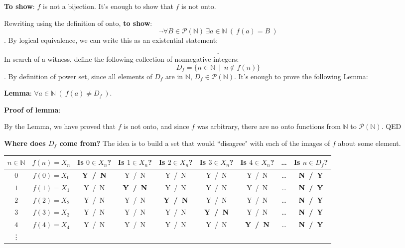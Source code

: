 \documentclass[12pt, oneside]{article}
\begin{document}
{\bf To show}: $f$ is not a bijection.  It's enough to show that $f$ is not onto.

Rewriting using the definition of  onto, {\bf to show}:
\[
\neg  \forall  B \in  \mathcal{P}(\mathbb{N}) ~\exists a \in \mathbb{N}  ~(~f(a) =  B~)
\]
. By logical  equivalence, we can write this as an existential statement:
\[
\underline{\phantom{\qquad\qquad\exists B \in  \mathcal{P}(\mathbb{N}) ~\forall a \in \mathbb{N}  ~(~f(a) \neq  B~)\qquad\qquad}}
\]
In search of a witness, define the following  collection of nonnegative integers:
\[
D_f = \{ n \in \mathbb{N}  ~\mid~  n \notin f(n)  \}
\]
. By  definition  of power  set, since  all elements  of  $D_f$ are  in  $\mathbb{N}$,   $D_f \in \mathcal{P}(\mathbb{N})$.  It's enough to prove the following Lemma: 

{\bf Lemma}: $\forall a \in \mathbb{N}  ~(~f(a) \neq  D_f~)$.


{\bf Proof  of lemma}: \\

\vspace{50pt}

By  the Lemma, we  have proved that $f$ is not onto, and since $f$ was arbitrary, there are no onto
functions from $\mathbb{N}$ to $\mathcal{P}(\mathbb{N})$. QED


{\bf Where does $D_f$ come from?} The idea is to build a set that would ``disagree" with 
each of the images of $f$ about some element. 

\begin{center}
\begin{tabular}{c|c|ccccccc}
$n \in \mathbb{N}$ & $f(n) = X_n$ &  Is $0   \in X_n$?   & Is $1 \in X_n$?  &  Is $2 \in X_n$?  &  Is $3 \in X_n$?  &
 Is $4 \in X_n$?  &  \ldots & Is $n \in D_f$?\\
\hline
$0$ & $f(0) = X_0$ & {\bf  Y~/~N}  & Y~/~N & Y~/~N & Y~/~N &Y~/~N & \ldots & {\bf  N~/~Y }\\
$1$ & $f(1) = X_1$ & Y~/~N  & {\bf  Y~/~N} & Y~/~N & Y~/~N & Y~/~N & \ldots & {\bf  N~/~Y }\\
$2$ & $f(2) = X_2$ & Y~/~N  & Y~/~N & {\bf  Y~/~N} & Y~/~N &Y~/~N & \ldots & {\bf  N~/~Y }\\
$3$ & $f(3) = X_3$ & Y~/~N  & Y~/~N & Y~/~N & {\bf  Y~/~N} & Y~/~N & \ldots & {\bf  N~/~Y }\\
$4$ & $f(4) = X_4$ & Y~/~N  & Y~/~N & Y~/~N & Y~/~N &{\bf  Y~/~N} & \ldots & {\bf  N~/~Y }\\
\vdots
\end{tabular}
\end{center} \vfill
\end{document}
